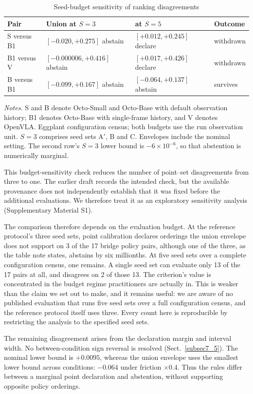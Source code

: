 \documentclass[pdflatex,iicol,sn-apa]{sn-jnl}
\theoremstyle{remark}
\newcommand{\tablenote}[1]{\par\vspace{4pt}\noindent
\begin{minipage}{\linewidth}\tablefootnotefont\raggedright #1\par\end{minipage}}
\begin{document}
\begin{table}[t]
\caption{Seed-budget sensitivity of ranking disagreements}\label{tab6}
\begin{tabular}{@{}llll@{}}
\toprule
Pair & Union at $S=3$ & at $S=5$ & Outcome \\
\midrule
S versus B1 & $[-0.020, +0.275]$ abstain & $[+0.012, +0.245]$ declare & withdrawn \\
B1 versus V & $[-0.000006, +0.416]$ abstain & $[+0.017, +0.426]$ declare & withdrawn \\
B versus B1 & $[-0.099, +0.167]$ abstain & $[-0.064, +0.137]$ abstain & survives \\
\bottomrule
\end{tabular}
\tablenote{\textit{Notes.} S and B denote Octo-Small and Octo-Base with default observation history; B1 denotes Octo-Base with single-frame history, and V denotes OpenVLA. Eggplant configuration census; both budgets use the run observation unit. $S=3$ comprises seed sets A$'$, B and C. Envelopes include the nominal setting. The second row's $S=3$ lower bound is $-6\times10^{-6}$, so that abstention is numerically marginal.}
\end{table}

This budget-sensitivity check reduces the number of point--set disagreements from three to one.
The earlier draft records the intended check, but the available provenance does not independently
establish that it was fixed before the additional evaluations. We therefore treat it as an
exploratory sensitivity analysis (Supplementary Material S1).

The comparison therefore depends on the evaluation budget. At the reference protocol's
three seed sets, point calibration declares orderings the union envelope does not support on
3 of the 17 bridge policy pairs, although one of the three, as the table note states, abstains
by six millionths. At five seed sets over a complete configuration census, one remains. A single
seed set can evaluate only 13 of the 17 pairs at all, and disagrees on 2 of those 13. The
criterion's value is concentrated in the budget
regime practitioners are actually in. This is weaker than the claim we set out to make, and it
remains useful: we are aware of no published evaluation that runs five seed sets over a full
configuration census, and the reference protocol itself uses three. Every count here is reproducible
by restricting the analysis to the specified seed sets.

The remaining disagreement arises from the declaration margin and interval width.
No between-condition sign reversal is resolved (Sect.~\ref{subsec7_5}). The nominal lower bound
is $+0.0095$, whereas the union envelope uses the smallest lower bound across conditions:
$-0.064$ under friction $\times 0.4$. Thus the rules differ between a marginal point declaration
and abstention, without supporting opposite policy orderings.
\end{document}
